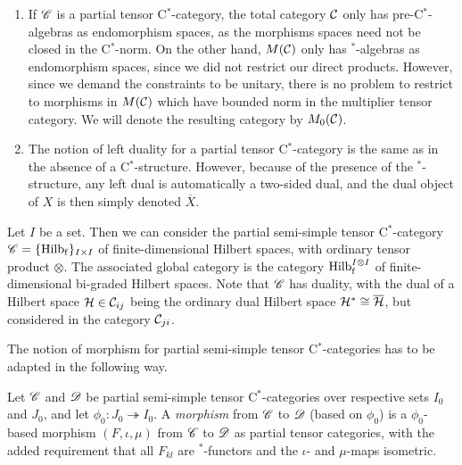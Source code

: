 \begin{Rem}\begin{enumerate}\item If $\mathscr{C}$ is a partial tensor C$^*$-category, the total category $\mathcal{C}$ only has pre-C$^*$-algebras as endomorphism spaces, as the morphisms spaces need not be closed in the C$^*$-norm. On the other hand, $M(\mathcal{C})$ only has $^*$-algebras as endomorphism spaces, since we did not restrict our direct products. However, since we demand the constraints to be unitary, there is no problem to restrict to morphisms in $M(\mathcal{C})$ which have bounded norm in the multiplier tensor category. We will denote the resulting category by $M_0(\mathcal{C})$. %
\item The notion of left duality for a partial tensor C$^*$-category is the same as in the absence of a C$^*$-structure. However, because of the presence of the $^*$-structure, any left dual is automatically a two-sided dual, and the dual object of $X$ is then simply denoted $\overline{X}$.  
\end{enumerate}
\end{Rem}

\begin{Exa} Let $I$ be a set. Then we can consider the partial semi-simple tensor C$^*$-category $\mathscr{C} = \{\mathrm{Hilb}_{\operatorname{\mathrm{f}}}\}_{I\times I}$ of finite-dimensional Hilbert spaces, with ordinary tensor product $\otimes$. The associated global category is the category $\mathrm{Hilb}_{\operatorname{\mathrm{f}}}^{I\otimes I}$ of finite-dimensional bi-graded Hilbert spaces. Note that $\mathscr{C}$ has duality, with the dual of a Hilbert space $\mathcal{H} \in \mathcal{C}_{ij}$ being the ordinary dual Hilbert space $\mathcal{H}^* \cong \overline{\mathcal{H}}$, but considered in the category $\mathcal{C}_{ji}$. 
\end{Exa}

The notion of morphism for partial semi-simple tensor C$^*$-categories has to be adapted in the following way.

\begin{Def} Let $\mathscr{C}$ and $\mathscr{D}$ be partial semi-simple tensor C$^*$-categories over respective sets $I_0$ and $J_0$, and let $\phi_0:J_0\twoheadrightarrow I_0$. 
A \emph{morphism} from $\mathscr{C}$ to $\mathscr{D}$ (based on $\phi_0$) is a $\phi_0$-based morphism $(F,\iota,\mu)$ from $\mathscr{C}$ to $\mathscr{D}$ as partial tensor categories, with the added requirement that all $F_{kl}$ are $^*$-functors and the $\iota$- and $\mu$-maps isometric. 
\end{Def} 


